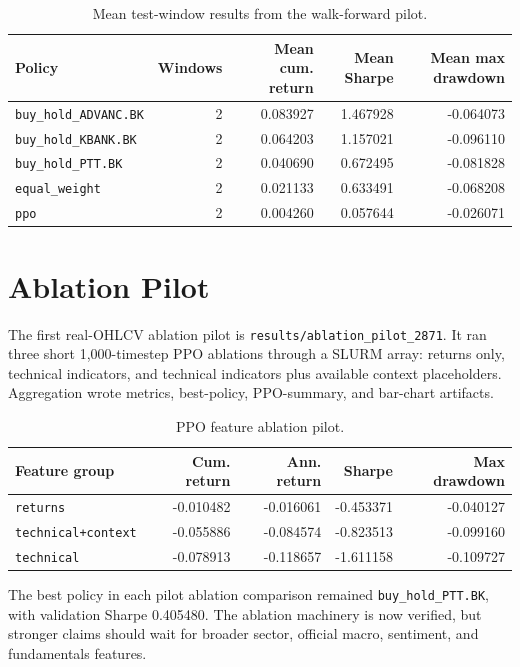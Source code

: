 \documentclass[11pt]{article}
\begin{document}
\begin{table}[h]
\centering
\caption{Mean test-window results from the walk-forward pilot.}
\label{tab:walk-forward}
\begin{tabular}{lrrrr}
\toprule
Policy & Windows & Mean cum. return & Mean Sharpe & Mean max drawdown \\
\midrule
\texttt{buy\_hold\_ADVANC.BK} & 2 & 0.083927 & 1.467928 & -0.064073 \\
\texttt{buy\_hold\_KBANK.BK} & 2 & 0.064203 & 1.157021 & -0.096110 \\
\texttt{buy\_hold\_PTT.BK} & 2 & 0.040690 & 0.672495 & -0.081828 \\
\texttt{equal\_weight} & 2 & 0.021133 & 0.633491 & -0.068208 \\
\texttt{ppo} & 2 & 0.004260 & 0.057644 & -0.026071 \\
\bottomrule
\end{tabular}
\end{table}

\section{Ablation Pilot}
The first real-OHLCV ablation pilot is \texttt{results/ablation\_pilot\_2871}. It ran three short 1,000-timestep PPO ablations through a SLURM array: returns only, technical indicators, and technical indicators plus available context placeholders. Aggregation wrote metrics, best-policy, PPO-summary, and bar-chart artifacts.

\begin{table}[h]
\centering
\caption{PPO feature ablation pilot.}
\label{tab:ablation}
\begin{tabular}{lrrrr}
\toprule
Feature group & Cum. return & Ann. return & Sharpe & Max drawdown \\
\midrule
\texttt{returns} & -0.010482 & -0.016061 & -0.453371 & -0.040127 \\
\texttt{technical+context} & -0.055886 & -0.084574 & -0.823513 & -0.099160 \\
\texttt{technical} & -0.078913 & -0.118657 & -1.611158 & -0.109727 \\
\bottomrule
\end{tabular}
\end{table}

The best policy in each pilot ablation comparison remained \texttt{buy\_hold\_PTT.BK}, with validation Sharpe 0.405480. The ablation machinery is now verified, but stronger claims should wait for broader sector, official macro, sentiment, and fundamentals features.
\end{document}

